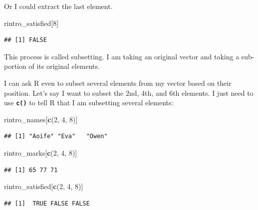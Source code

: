 \documentclass[
]{book}
\newenvironment{Shaded}{\begin{snugshade}}{\end{snugshade}}
\newcommand{\DecValTok}[1]{\textcolor[rgb]{0.00,0.00,0.81}{#1}}
\newcommand{\FunctionTok}[1]{\textcolor[rgb]{0.13,0.29,0.53}{\textbf{#1}}}
\newcommand{\NormalTok}[1]{#1}
\begin{document}
Or I could extract the last element.

\begin{Shaded}
\begin{Highlighting}[]
\NormalTok{rintro\_satisfied[}\DecValTok{8}\NormalTok{]}
\end{Highlighting}
\end{Shaded}

\begin{verbatim}
## [1] FALSE
\end{verbatim}

This process is called subsetting. I am taking an original vector and taking a sub-portion of its original elements.

I can ask R even to subset several elements from my vector based on their position. Let's say I want to subset the 2nd, 4th, and 6th elements. I just need to use \textbf{\texttt{c()}} to tell R that I am subsetting several elements:

\begin{Shaded}
\begin{Highlighting}[]
\NormalTok{rintro\_names[}\FunctionTok{c}\NormalTok{(}\DecValTok{2}\NormalTok{, }\DecValTok{4}\NormalTok{, }\DecValTok{8}\NormalTok{)]}
\end{Highlighting}
\end{Shaded}

\begin{verbatim}
## [1] "Aoife" "Eva"   "Owen"
\end{verbatim}

\begin{Shaded}
\begin{Highlighting}[]
\NormalTok{rintro\_marks[}\FunctionTok{c}\NormalTok{(}\DecValTok{2}\NormalTok{, }\DecValTok{4}\NormalTok{, }\DecValTok{8}\NormalTok{)]}
\end{Highlighting}
\end{Shaded}

\begin{verbatim}
## [1] 65 77 71
\end{verbatim}

\begin{Shaded}
\begin{Highlighting}[]
\NormalTok{rintro\_satisfied[}\FunctionTok{c}\NormalTok{(}\DecValTok{2}\NormalTok{, }\DecValTok{4}\NormalTok{, }\DecValTok{8}\NormalTok{)]}
\end{Highlighting}
\end{Shaded}

\begin{verbatim}
## [1]  TRUE FALSE FALSE
\end{verbatim}
\end{document}
